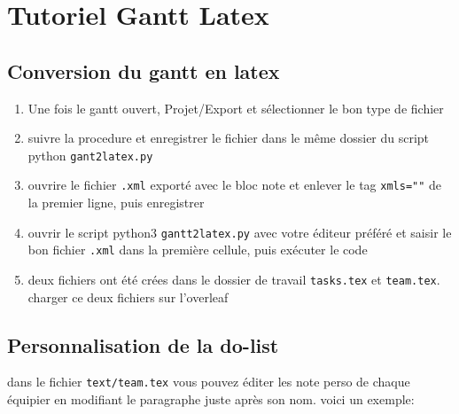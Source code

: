 \section{Tutoriel Gantt Latex}

\subsection{Conversion du gantt en latex}

\begin{enumerate}
	\item Une fois le gantt ouvert, Projet/Export et sélectionner le bon type de fichier \\ 
	\item suivre la procedure et enregistrer le fichier dans le même dossier du script python \texttt{gant2latex.py}
	\item ouvrire le fichier \texttt{.xml} exporté avec le bloc note et enlever le tag \texttt{xmls=""} %
	 de la premier ligne, puis enregistrer
	\item ouvrir le script python3 \texttt{gantt2latex.py} avec votre éditeur préféré et saisir le bon fichier \texttt{.xml} dans la première cellule, puis exécuter le code
	\item deux fichiers ont été crées dans le dossier de travail \texttt{tasks.tex} et \texttt{team.tex}. charger ce deux fichiers sur l'overleaf \\ 
\end{enumerate}

\subsection{Personnalisation de la do-list}

\par dans le fichier \texttt{text/team.tex} vous pouvez éditer les note perso de chaque équipier en modifiant le paragraphe juste après son nom. voici un exemple: \\
